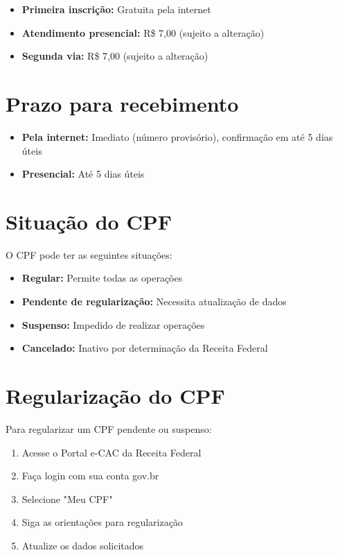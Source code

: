 \documentclass[12pt,a4paper]{article}
\begin{document}
\begin{itemize}
    \item \textbf{Primeira inscrição:} Gratuita pela internet
    \item \textbf{Atendimento presencial:} R\$ 7,00 (sujeito a alteração)
    \item \textbf{Segunda via:} R\$ 7,00 (sujeito a alteração)
\end{itemize}

\section{Prazo para recebimento}

\begin{itemize}
    \item \textbf{Pela internet:} Imediato (número provisório), confirmação em até 5 dias úteis
    \item \textbf{Presencial:} Até 5 dias úteis
\end{itemize}

\section{Situação do CPF}

O CPF pode ter as seguintes situações:
\begin{itemize}
    \item \textbf{Regular:} Permite todas as operações
    \item \textbf{Pendente de regularização:} Necessita atualização de dados
    \item \textbf{Suspenso:} Impedido de realizar operações
    \item \textbf{Cancelado:} Inativo por determinação da Receita Federal
\end{itemize}

\section{Regularização do CPF}

Para regularizar um CPF pendente ou suspenso:
\begin{enumerate}
    \item Acesse o Portal e-CAC da Receita Federal
    \item Faça login com sua conta gov.br
    \item Selecione "Meu CPF"
    \item Siga as orientações para regularização
    \item Atualize os dados solicitados
\end{enumerate}
\end{document}
